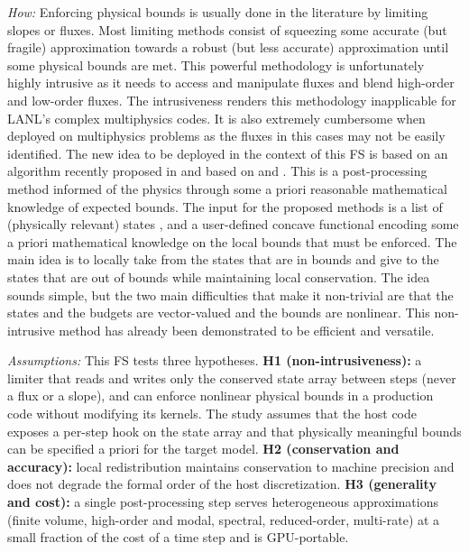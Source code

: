 \documentclass[12pt,twoside]{paper}
\begin{document}
\vspace*{0.5\baselineskip}

\textit{How:} Enforcing physical bounds is usually done in the literature
by limiting slopes or fluxes. Most limiting methods consist of squeezing
some accurate (but fragile) approximation towards a robust (but less
accurate) approximation until some physical bounds are met. This powerful
methodology is unfortunately highly intrusive as it needs to access and
manipulate fluxes and blend high-order and low-order fluxes. The
intrusiveness renders this methodology inapplicable for LANL's complex
multiphysics codes. It is also extremely cumbersome when deployed on
multiphysics problems as the fluxes in this cases may not be easily
identified.
%
The new idea to be deployed in the context of this FS is based on an algorithm
recently proposed in \cite{Guermond_arxiv_2026} and based on
\cite[\S2.3]{Kucharik_Shashkov_Wendroff_JCP_2003} and
\cite{Liu_Cheng_Shu_JSC_2017,Griffin_Shu_RMathSci_2026}. This is a
post-processing method informed of the physics through some a priori reasonable
mathematical knowledge of expected bounds. The input for the
proposed methods is a list of (physically relevant) states , and a user-defined concave functional encoding
some a priori mathematical knowledge on the local bounds that must be
enforced. The main idea is to locally take from the states that are in
bounds and give to the states that are out of bounds while maintaining
local conservation. The idea sounds simple, but the two main difficulties
that make it non-trivial are that the states and the budgets are
vector-valued and the bounds are nonlinear. This non-intrusive method has
already been demonstrated to be efficient and versatile.

\vspace*{0.5\baselineskip}

\textit{Assumptions: } This FS tests three hypotheses. \textbf{H1
(non-intrusiveness):} a limiter that reads and writes only the conserved
state array between steps (never a flux or a slope), and can enforce
nonlinear physical bounds in a production code without modifying its
kernels. The study assumes that the host code exposes a per-step hook on
the state array and that physically meaningful bounds can be specified a
priori for the target model. \textbf{H2 (conservation and accuracy):} local
redistribution maintains conservation to machine precision and does not
degrade the formal order of the host discretization. \textbf{H3 (generality
and cost):} a single post-processing step serves heterogeneous
approximations (finite volume, high-order and modal, spectral,
reduced-order, multi-rate) at a small fraction of the cost of a time step
and is GPU-portable.
\end{document}
